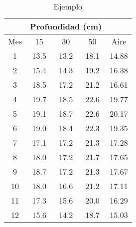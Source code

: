 \begin{example}
    \begin{table}[h!]\centering
        \begin{tabular}{@{}ccccc@{}}
        \toprule
            & \multicolumn{3}{c}{Profundidad (cm)} &       \\ \midrule
        Mes & 15         & 30         & 50         & Aire  \\
        1   & 13.5       & 13.2       & 18.1       & 14.88 \\
        2   & 15.4       & 14.3       & 19.2       & 16.38 \\
        3   & 18.5       & 17.2       & 21.2       & 16.61 \\
        4   & 19.7       & 18.5       & 22.6       & 19.77 \\
        5   & 19.1       & 18.7       & 22.6       & 20.17 \\
        6   & 19.0       & 18.4       & 22.3       & 19.35 \\
        7   & 17.1       & 17.2       & 21.3       & 17.28 \\
        8   & 18.0       & 17.2       & 21.7       & 17.65 \\
        9   & 18.7       & 17.2       & 21.3       & 17.67 \\
        10  & 18.0       & 16.6       & 21.2       & 17.11 \\
        11  & 17.3       & 15.6       & 20.0       & 16.29 \\
        12  & 15.6       & 14.2       & 18.7       & 15.03 \\ \bottomrule
        \end{tabular}
        \caption{Ejemplo}
        \label{tabma23}
        \end{table}
\end{example}

